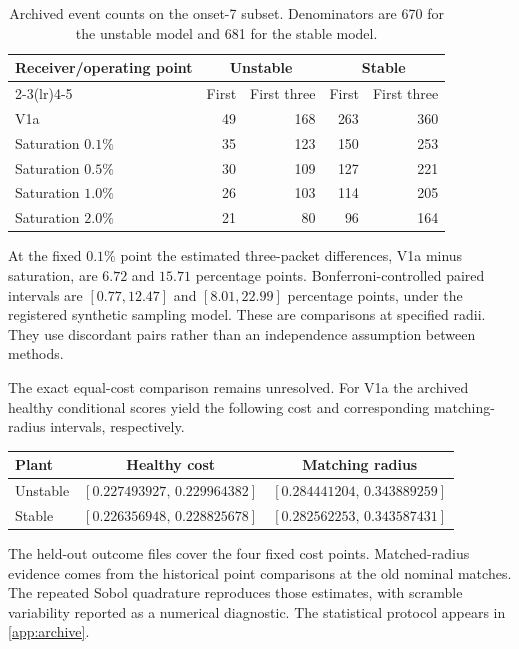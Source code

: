 \begin{table}[htbp]
\centering
\caption{Archived event counts on the onset-7 subset. Denominators are 670 for the unstable model and 681 for the stable model.}
\label{tab:counts}
\begin{tabular}{lrrrr}
\toprule
Receiver/operating point & \multicolumn{2}{c}{Unstable} & \multicolumn{2}{c}{Stable}\\
\cmidrule(lr){2-3}\cmidrule(lr){4-5}
 & First & First three & First & First three\\
\midrule
V1a           & 49 & 168 & 263 & 360\\
Saturation \(0.1\%\) & 35 & 123 & 150 & 253\\
Saturation \(0.5\%\) & 30 & 109 & 127 & 221\\
Saturation \(1.0\%\) & 26 & 103 & 114 & 205\\
Saturation \(2.0\%\) & 21 & 80  & 96  & 164\\
\bottomrule
\end{tabular}
\end{table}
\FloatBarrier

At the fixed \(0.1\%\) point the estimated three-packet differences, V1a minus saturation, are \(6.72\) and \(15.71\) percentage points. Bonferroni-controlled paired intervals are \([0.77,12.47]\) and \([8.01,22.99]\) percentage points, under the registered synthetic sampling model. These are comparisons at specified radii. They use discordant pairs rather than an independence assumption between methods.

The exact equal-cost comparison remains unresolved. For V1a the archived healthy conditional scores yield the following cost and corresponding matching-radius intervals, respectively.
\begin{center}
\begin{tabular}{lcc}
\toprule
Plant & Healthy cost & Matching radius \\
\midrule
Unstable & $[0.227493927,\,0.229964382]$ & $[0.284441204,\,0.343889259]$ \\
Stable   & $[0.226356948,\,0.228825678]$ & $[0.282562253,\,0.343587431]$ \\
\bottomrule
\end{tabular}
\end{center}
The held-out outcome files cover the four fixed cost points. Matched-radius evidence comes from the historical point comparisons at the old nominal matches. The repeated Sobol quadrature reproduces those estimates, with scramble variability reported as a numerical diagnostic. The statistical protocol appears in \ref{app:archive}.

